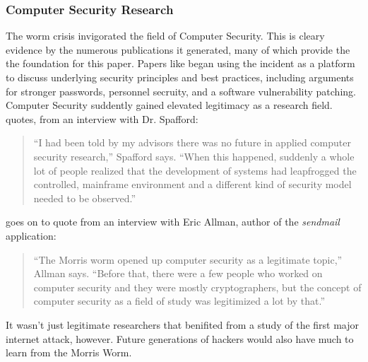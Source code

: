 \subsubsection*{Computer Security Research}
The worm crisis invigorated the field of Computer Security. This is cleary
evidence by the numerous publications it generated, many of which provide the
the foundation for this paper. Papers like \cite{eichin_microscope_1989} began
using the incident as a platform to discuss underlying security principles and
best practices, including arguments for stronger passwords, personnel secruity,
and a software vulnerability patching. Computer Security suddently gained
elevated legitimacy as a research field. \cite{marsan_morris_2008} quotes, from
an interview with Dr. Spafford:
\begin{quote}
``I had been told by my advisors there was no future in applied computer
security research,'' Spafford says. ``When this happened, suddenly a whole lot
of people realized that the development of systems had leapfrogged the
controlled, mainframe environment and a different kind of security model needed
to be observed.''
\end{quote}

\cite{marsan_morris_2008} goes on to quote from an interview with Eric Allman,
author of the \textit{sendmail} application:
\begin{quote}
``The Morris worm opened up computer security as a legitimate topic,'' Allman
says. ``Before that, there were a few people who worked on computer security
and they were mostly cryptographers, but the concept of computer security as a
field of study was legitimized a lot by that.''
\end{quote}

It wasn't just legitimate researchers that benifited from a study of the first
major internet attack, however. Future generations of hackers would
also have much to learn from the Morris Worm.
    